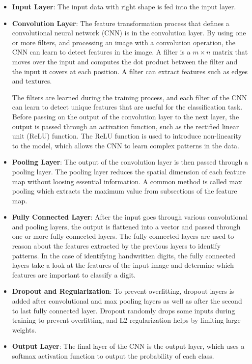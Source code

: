 \begin{itemize}
    \item \textbf{Input Layer}: The input data with right shape is fed into the input layer.
    \item \textbf{Convolution Layer}: The feature transformation process that defines a convolutional neural network (CNN) is in the convolution layer. By using one or more filters, and processing an image with a convolution operation, the CNN can learn to detect features in the image. A filter is a $m \times n$ matrix that moves over the input and computes the dot product between the filter and the input it covers at each position. A filter can extract features such as edges and textures. 
    \par
    The filters are learned during the training process, and each filter of the CNN can learn to detect unique features that are useful for the classification task. Before passing on the output of the convolution layer to the next layer, the output is passed through an activation function, such as the rectified linear unit (ReLU) function. The ReLU function is used to introduce non-linearity to the model, which allows the CNN to learn complex patterns in the data.
    \item \textbf{Pooling Layer}: The output of the convolution layer is then passed through a pooling layer. The pooling layer reduces the spatial dimension of each feature map without loosing essential information. A common method is called max pooling which extracts the maximum value from subsections of the feature map.
    \item \textbf{Fully Connected Layer}: After the input goes through various convolutional and pooling layers, the output is flattened into a vector and passed through one or more fully connected layers. The fully connected layers are used to reason about the features extracted by the previous layers to identify patterns. In the case of identifying handwritten digits, the fully connected layers take a look at the features of the input image and determine which features are important to classify a digit.
    \item \textbf{Dropout and Regularization}: To prevent overfitting, dropout layers is added after convolutional and max pooling layers as well as after the second to last fully connected layer. Dropout randomly drops some inputs during training to prevent overfitting, and L2 regularization helps by limiting large weights.
    \item \textbf{Output Layer}: The final layer of the CNN is the output layer, which uses a softmax activation function to output the probability of each class. 
\end{itemize}

